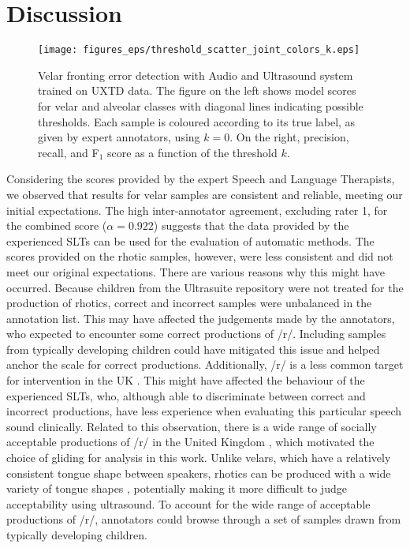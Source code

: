 \section{Discussion}
\label{sec:discussion}

\begin{figure*}[t!]
    \centering
    \texttt{[image: figures\_eps/threshold\_scatter\_joint\_colors\_k.eps]}
    \caption{
Velar fronting error detection with Audio and Ultrasound system trained on UXTD data.
The figure on the left shows model scores for velar and alveolar classes with diagonal lines indicating possible thresholds.
Each sample is coloured according to its true label, as given by expert annotators, using $k=0$.
On the right, precision, recall, and F$_1$ score as a function of the threshold $k$.}
    \label{fig:results_scatter_threshold_joint}
\end{figure*}

Considering the scores provided by the expert Speech and Language Therapists, we observed that results for velar samples are consistent and reliable, meeting our initial expectations.
The high inter-annotator agreement, excluding rater 1, for the combined score ($\alpha = 0.922$) suggests that the data provided by the experienced SLTs can be used for the evaluation of automatic methods.
The scores provided on the rhotic samples, however, were less consistent and did not meet our original expectations.
There are various reasons why this might have occurred.
Because children from the Ultrasuite repository were not treated for the production of rhotics, correct and incorrect samples were  unbalanced in the annotation list.
This may have affected the judgements made by the annotators, who expected to encounter some correct productions of /r/.
Including samples from typically developing children could have mitigated this issue and helped anchor the scale for correct productions.
Additionally, /r/ is a less common target for intervention in the UK \citep{wren2016prevalence}.
This might have affected the behaviour of the experienced SLTs, who, although able to discriminate between correct and incorrect productions, have less experience when evaluating this particular speech sound clinically.
Related to this observation, there is a wide range of socially acceptable productions of /r/ in the United Kingdom \citep{scobbie2006r, lawson2011social}, which motivated the choice of gliding for analysis in this work.
Unlike velars, which have a relatively consistent tongue shape between speakers, rhotics can be produced with a wide variety of tongue shapes \citep{boyce2015articulatory}, potentially making it more difficult to judge acceptability using ultrasound.
To account for the wide range of acceptable productions of /r/, annotators could browse through a set of samples drawn from typically developing children.

